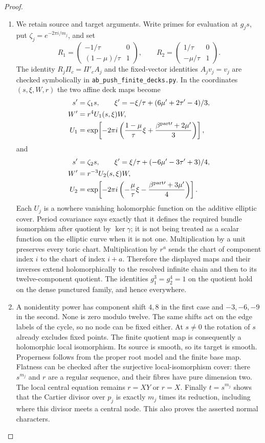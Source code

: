 \begin{proof}
\begin{enumerate}[label=\arabic*.,leftmargin=*]
\item We retain source and target arguments. Write primes for
evaluation at $g_js$, put $\zeta_j=e^{-2\pi i/m_j}$,
and set
\[
 R_1=\begin{pmatrix}-1/\tau&0\\(1-\mu)/\tau&1\end{pmatrix},
 \qquad
 R_2=\begin{pmatrix}1/\tau&0\\-\mu/\tau&1\end{pmatrix}.
\]
The identity $R_j\Pi_c=\Pi'_c A_j$ and the fixed-vector
identities $A_jv_j=v_j$ are checked symbolically in
\texttt{ab\_push\_finite\_decks.py}. In the coordinates
$(s,\xi,W,r)$ the two affine deck maps become
\begin{align*}
 s'&=\zeta_1s,\qquad
 \xi'=-\xi/\tau+(6\mu'+2\tau'-4)/3,\\
 W'&=r^4 U_1(s,\xi)W,\\
 U_1&=\exp\!\left[-2\pi i
  \left(\frac{1-\mu}{\tau}\xi+
        \frac{\beta^{{\rm part}\prime}+2\mu'}3\right)\right],
 \end{align*}
and
\begin{align*}
 s'&=\zeta_2s,\qquad
 \xi'=\xi/\tau+(-6\mu'-3\tau'+3)/4,\\
 W'&=r^{-3} U_2(s,\xi)W,\\
 U_2&=\exp\!\left[-2\pi i
  \left(-\frac{\mu}{\tau}\xi-
        \frac{\beta^{{\rm part}\prime}+3\mu'}4\right)\right].
 \end{align*}
Each $U_j$ is a nowhere vanishing holomorphic function on
the additive elliptic cover. Period covariance says
exactly that it defines the required bundle isomorphism
after quotient by $\ker\gamma$; it is not being treated
as a scalar function on the elliptic curve when it is not
one. Multiplication by a unit preserves every toric chart.
Multiplication by $r^a$ sends the chart of component index
$i$ to the chart of index $i+a$. Therefore the displayed
maps and their inverses extend holomorphically to the
resolved infinite chain and then to its twelve-component
quotient. The identities $g_1^3=g_2^4=1$ on the quotient
hold on the dense punctured family, and hence everywhere.

\item A nonidentity power has component shift $4,8$ in the first
case and $-3,-6,-9$ in the second. None is zero modulo
twelve. The same shifts act on the edge labels of the
cycle, so no node can be fixed either. At $s\ne0$ the
rotation of $s$ already excludes fixed points. The finite
quotient map is consequently a holomorphic local
isomorphism. Its source is smooth, so its target is smooth.
Properness follows from the proper root model and the
finite base map. Flatness can be checked after the
surjective local-isomorphism cover: there $s^{m_j}$ and
$r$ are a regular sequence, and their fibres have pure
dimension two. The local central equation remains
$r=XY$ or $r=X$. Finally $t=s^{m_j}$ shows that the
Cartier divisor over $p_j$ is exactly $m_j$ times its
reduction, including where this divisor meets a central
node. This also proves the asserted normal characters.


\end{enumerate}
\end{proof}
